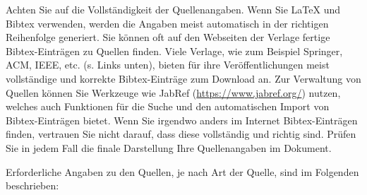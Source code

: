 Achten Sie auf die Vollständigkeit der Quellenangaben. Wenn Sie \LaTeX{} und Bibtex verwenden, werden die Angaben meist automatisch in der richtigen Reihenfolge generiert. Sie können oft auf den Webseiten der Verlage fertige Bibtex-Einträgen zu Quellen finden. Viele Verlage, wie zum Beispiel Springer, ACM, IEEE, etc. (s. Links unten), bieten für ihre Veröffentlichungen meist vollständige und korrekte Bibtex-Einträge zum Download an. Zur Verwaltung von Quellen können Sie Werkzeuge wie JabRef (\url{https://www.jabref.org/}) nutzen, welches auch Funktionen für die Suche und den automatischen Import von Bibtex-Einträgen bietet. Wenn Sie irgendwo anders im Internet Bibtex-Einträgen finden, vertrauen Sie nicht darauf, dass diese vollständig und richtig sind. Prüfen Sie in jedem Fall die finale Darstellung Ihre Quellenangaben im Dokument. 

Erforderliche Angaben zu den Quellen, je nach Art der Quelle, sind im Folgenden beschrieben:


